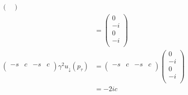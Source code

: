 \begin{align*}
\begin{pmatrix}
    \end{pmatrix}\\
    &= \begin{pmatrix}
        0 \\
        -i \\
        0 \\
        -i \\
    \end{pmatrix}\\
    \begin{pmatrix}
        -s & c & -s & c \\
    \end{pmatrix} \gamma^2 u_\downarrow(p_\tau) &= \begin{pmatrix}
        -s & c & -s & c \\
    \end{pmatrix}\begin{pmatrix}
        0 \\
        -i \\
        0 \\
        -i \\
    \end{pmatrix}\\
    &= -2ic\\
\end{align*}


